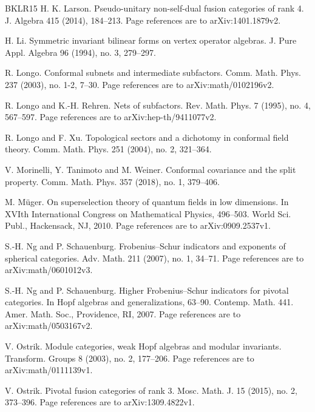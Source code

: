 \documentclass[leqno]{article}
\numberwithin{equation}{section}
\begin{document}
\begin{thebibliography}{BKLR15}
H. K. Larson.
\newblock Pseudo-unitary non-self-dual fusion categories of rank 4.
\newblock J. Algebra 415 (2014), 184--213. Page references are to arXiv:1401.1879v2.

H. Li.
\newblock Symmetric invariant bilinear forms on vertex operator algebras.
\newblock J. Pure Appl. Algebra 96 (1994), no. 3, 279--297.

R. Longo.
\newblock Conformal subnets and intermediate subfactors.
\newblock Comm. Math. Phys. 237 (2003), no. 1-2, 7--30. Page references are to arXiv:math/0102196v2.

R. Longo and K.-H. Rehren.
\newblock Nets of subfactors.
\newblock Rev. Math. Phys. 7 (1995), no. 4, 567--597. Page references are to arXiv:hep-th/9411077v2.

R. Longo and F. Xu.
\newblock Topological sectors and a dichotomy in conformal field theory.
\newblock Comm. Math. Phys. 251 (2004), no. 2, 321--364.

V. Morinelli, Y. Tanimoto and M. Weiner.
\newblock Conformal covariance and the split property.
\newblock Comm. Math. Phys. 357 (2018), no. 1, 379--406.

M. M\"uger.
\newblock On superselection theory of quantum fields in low dimensions.
\newblock In XVIth International Congress on Mathematical Physics, 496--503. World Sci. Publ., Hackensack, NJ, 2010. Page references are to arXiv:0909.2537v1.

S.-H. Ng and P. Schauenburg.
\newblock Frobenius--Schur indicators and exponents of spherical categories.
\newblock Adv. Math. 211 (2007), no. 1, 34--71. Page references are to arXiv:math/0601012v3.

S.-H. Ng and P. Schauenburg.
\newblock Higher Frobenius--Schur indicators for pivotal categories.
\newblock In Hopf algebras and generalizations, 63--90. Contemp. Math. 441. Amer. Math. Soc., Providence, RI, 2007. Page references are to arXiv:math/0503167v2.

V. Ostrik.
\newblock Module categories, weak Hopf algebras and modular invariants.
\newblock Transform. Groups 8 (2003), no. 2, 177--206. Page references are to arXiv:math/0111139v1.

V. Ostrik.
\newblock Pivotal fusion categories of rank 3.
\newblock Mosc. Math. J. 15 (2015), no. 2, 373--396. Page references are to arXiv:1309.4822v1.


\end{thebibliography}
\end{document}
